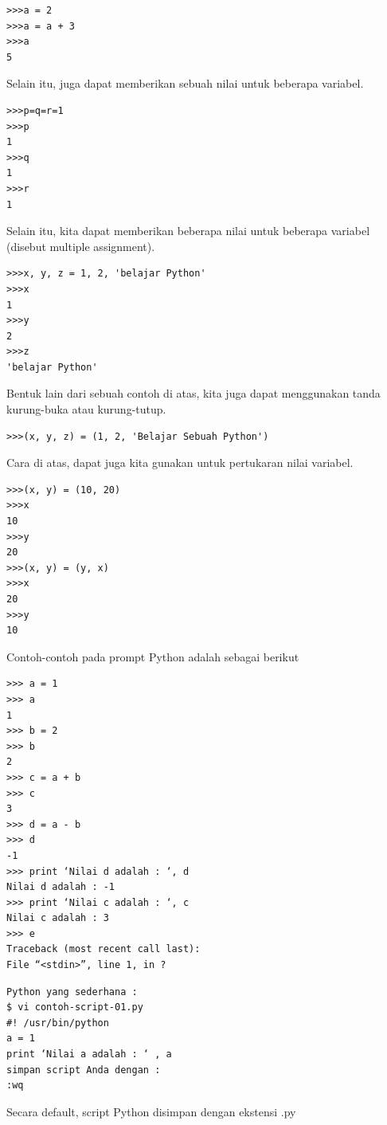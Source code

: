\begin{verbatim}
>>>a = 2
>>>a = a + 3
>>>a
5
\end{verbatim}

Selain itu, juga dapat memberikan sebuah nilai untuk beberapa variabel.

\begin{verbatim}
>>>p=q=r=1
>>>p
1
>>>q
1
>>>r
1
\end{verbatim}

Selain itu, kita dapat memberikan beberapa nilai untuk beberapa variabel (disebut multiple assignment).

\begin{verbatim}
>>>x, y, z = 1, 2, 'belajar Python'
>>>x
1
>>>y
2
>>>z
'belajar Python'
\end{verbatim}

Bentuk lain dari sebuah contoh di atas, kita juga dapat menggunakan tanda kurung-buka atau kurung-tutup.

\begin{verbatim}
>>>(x, y, z) = (1, 2, 'Belajar Sebuah Python')
\end{verbatim}
Cara di atas, dapat juga kita gunakan untuk pertukaran nilai variabel.
\begin{verbatim}
>>>(x, y) = (10, 20)
>>>x
10
>>>y
20
>>>(x, y) = (y, x)
>>>x
20
>>>y
10
\end{verbatim}

Contoh-contoh  pada prompt Python adalah sebagai berikut 

\begin{verbatim}
>>> a = 1
>>> a
1
>>> b = 2
>>> b
2
>>> c = a + b
>>> c
3
>>> d = a - b
>>> d
-1
>>> print ‘Nilai d adalah : ‘, d
Nilai d adalah : -1
>>> print ‘Nilai c adalah : ‘, c
Nilai c adalah : 3
>>> e
Traceback (most recent call last):
File “<stdin>”, line 1, in ?
\end{verbatim}

\begin{verbatim}
Python yang sederhana : 
$ vi contoh-script-01.py
#! /usr/bin/python
a = 1
print ‘Nilai a adalah : ‘ , a
simpan script Anda dengan : 
:wq
\end{verbatim}

Secara default, script Python disimpan dengan ekstensi .py

